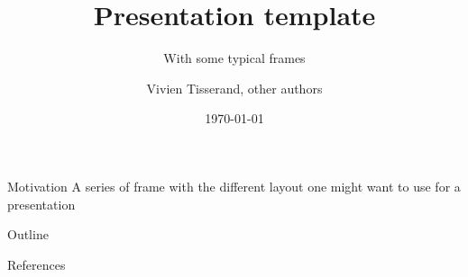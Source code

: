 \documentclass{beamer}
\title{Presentation template}
\subtitle{With some typical frames}
\author[Vivien Tisserand]{Vivien Tisserand, other authors}
\institute{\LaTeX Institute}
\date{\today}
\begin{document}
\begin{frame}
    \titlepage
\end{frame}

\begin{frame}{Motivation}
    A series of frame with the different layout one might want to use for a presentation
\end{frame}

\begin{frame}{Outline}
    \tableofcontents
\end{frame}



\begin{frame}[allowframebreaks]{References}
    \printbibliography
\end{frame}
\end{document}
